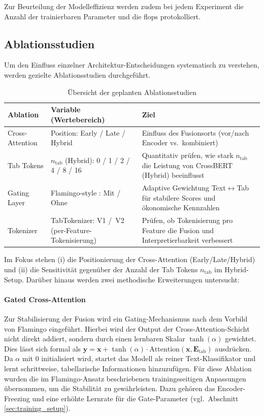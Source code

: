 Zur Beurteilung der Modelleffizienz werden zudem bei jedem Experiment die Anzahl der trainierbaren Parameter und die \Gls{flops} protokolliert.


\newpage
\subsection{Ablationsstudien}
\label{sec:ablations}

Um den Einfluss einzelner Architektur-Entscheidungen systematisch zu verstehen, werden gezielte Ablationsstudien durchgeführt.

\begin{table}[h]
\centering
\caption{Übersicht der geplanten Ablationsstudien}
\label{tab:ablations_overview}
\begin{tabular}{|l|p{}|p{}|}
\hline
\textbf{Ablation} & \textbf{Variable (Wertebereich)} & \textbf{Ziel} \\ \hline
Cross-Attention & Position: Early / Late / Hybrid & Einfluss des Fusionsorts (vor/nach Encoder vs.\ kombiniert) \\ \hline
Tab Tokens & $n_{\text{tab}}$ (Hybrid): 0 / 1 / 2 / 4 / 8 / 16 & Quantitativ prüfen, wie stark $n_{\text{tab}}$ die Leistung von CrossBERT (Hybrid) beeinflusst \\ \hline
Gating Layer & Flamingo-style \cite{Alayrac2022}: Mit / Ohne & Adaptive Gewichtung Text$\leftrightarrow$Tab für stabilere Scores und ökonomische Kennzahlen \\ \hline
Tokenizer & TabTokenizer: V1 /\ V2 (per-Feature-Tokenisierung) & Prüfen, ob Tokenisierung pro Feature die Fusion und Interpretierbarkeit verbessert \\ \hline
\end{tabular}
\end{table}

Im Fokus stehen (i) die Positionierung der Cross-Attention (Early/Late/Hybrid) und (ii) die Sensitivität gegenüber der Anzahl der Tab Tokens $n_{\text{tab}}$ im Hybrid-Setup. Darüber hinaus werden zwei methodische Erweiterungen untersucht:

\paragraph{Gated Cross-Attention} Zur Stabilisierung der Fusion wird ein Gating-Mechanismus nach dem Vorbild von Flamingo \cite{Alayrac2022} eingeführt. Hierbei wird der Output der Cross-Attention-Schicht nicht direkt addiert, sondern durch einen lernbaren Skalar $\tanh(\alpha)$ gewichtet. Dies lässt sich formal als $\mathbf{y} = \mathbf{x} + \tanh(\alpha) \cdot \text{Attention}(\mathbf{x}, \mathbf{E}_{\text{tab}})$ ausdrücken. Da $\alpha$ mit $0$ initialisiert wird, startet das Modell als reiner Text-Klassifikator und lernt schrittweise, tabellarische Informationen hinzuzufügen. Für diese Ablation wurden die im Flamingo-Ansatz beschriebenen trainingsseitigen Anpassungen übernommen, um die Stabilität zu gewährleisten. Dazu gehören das Encoder-Freezing und eine erhöhte Lernrate für die Gate-Parameter (vgl.\ Abschnitt \ref{sec:training_setup}).


